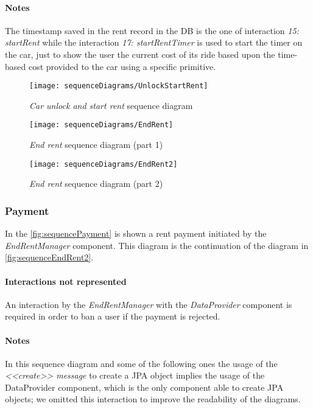 \paragraph{Notes}
The timestamp saved in the rent record in the DB is the one of interaction \emph{15: startRent} while the interaction \emph{17: startRentTimer} is used to start the timer on the car, just to show the user the current cost of its ride based upon the time-based cost provided to the car using a specific primitive.

\clearpage

\begin{figure}[h!]
	\centering
	\texttt{[image: sequenceDiagrams/UnlockStartRent]}
	\caption{
		\label{fig:sequenceUnlockStartRent} 
		\emph{Car unlock and start rent} sequence diagram
	}
\end{figure}
\begin{figure}[h!]
	\centering
	\texttt{[image: sequenceDiagrams/EndRent]}
	\caption{
		\label{fig:sequenceEndRent1} 
		\emph{End rent} sequence diagram (part 1)
	}
\end{figure}
\begin{figure}[h!]
	\centering
	\texttt{[image: sequenceDiagrams/EndRent2]}
	\caption{
		\label{fig:sequenceEndRent2} 
		\emph{End rent} sequence diagram (part 2)
	}
\end{figure}

\clearpage
\subsubsection{Payment}
In the \autoref{fig:sequencePayment} is shown a rent payment initiated by the \emph{EndRentManager} component. This diagram is the continuation of the diagram in \autoref{fig:sequenceEndRent2}.

\paragraph{Interactions not represented} An interaction by the \emph{EndRentManager} with the \emph{DataProvider} component is required in order to ban a user if the payment is rejected.

\paragraph{Notes}
In this sequence diagram and some of the following ones the usage of the \emph{<<create>> message} to create a JPA object implies the usage of the DataProvider component, which is the only component able to create JPA objects; we omitted this interaction to improve the readability of the diagrams.


